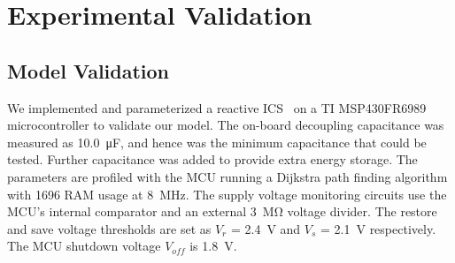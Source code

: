 
\section{Experimental Validation}

\subsection{Model Validation} \label{section:experiment}

We implemented and parameterized a reactive ICS~\cite{balsamo2015hibernus} on a TI MSP430FR6989 microcontroller to validate our model. The on-board decoupling capacitance was measured as \SI{10.0}{\micro\farad}, and hence was the minimum capacitance that could be tested. Further capacitance was added to provide extra energy storage. The parameters are profiled with the MCU running a Dijkstra path finding algorithm with \SI{1696}{\byte} RAM usage at \SI{8}{\mega\hertz}. The supply voltage monitoring circuits use the MCU's internal comparator and an external \SI{3}{\mega\ohm} voltage divider. The restore and save voltage thresholds are set as $V_{r}$ = \SI{2.4}{\volt} and $V_{s}$ = \SI{2.1}{\volt} respectively. The MCU shutdown voltage $V_{off}$ is \SI{1.8}{\volt}. 


